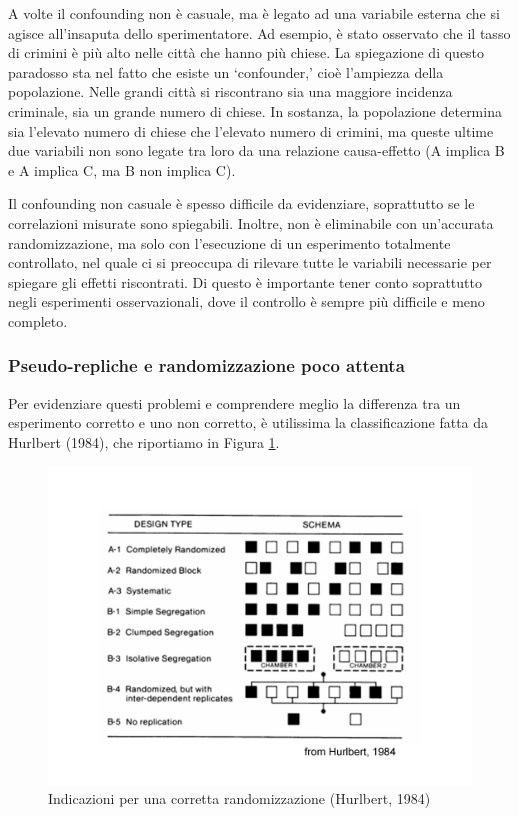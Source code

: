 \documentclass[a4paper,12pt,oneside]{book}
\begin{document}
A volte il confounding non è casuale, ma è legato ad una variabile esterna che si agisce all'insaputa dello sperimentatore. Ad esempio, è stato osservato che il tasso di crimini è più alto nelle città che hanno più chiese. La spiegazione di questo paradosso sta nel fatto che esiste un `confounder,' cioè l'ampiezza della popolazione. Nelle grandi città si riscontrano sia una maggiore incidenza criminale, sia un grande numero di chiese. In sostanza, la popolazione determina sia l'elevato numero di chiese che l'elevato numero di crimini, ma queste ultime due variabili non sono legate tra loro da una relazione causa-effetto (A implica B e A implica C, ma B non implica C).

Il confounding non casuale è spesso difficile da evidenziare, soprattutto se le correlazioni misurate sono spiegabili. Inoltre, non è eliminabile con un'accurata randomizzazione, ma solo con l'esecuzione di un esperimento totalmente controllato, nel quale ci si preoccupa di rilevare tutte le variabili necessarie per spiegare gli effetti riscontrati. Di questo è importante tener conto soprattutto negli esperimenti osservazionali, dove il controllo è sempre più difficile e meno completo.

\hypertarget{pseudo-repliche-e-randomizzazione-poco-attenta}{%
\subsubsection{Pseudo-repliche e randomizzazione poco attenta}\label{pseudo-repliche-e-randomizzazione-poco-attenta}}

Per evidenziare questi problemi e comprendere meglio la differenza tra un esperimento corretto e uno non corretto, è utilissima la classificazione fatta da Hurlbert (1984), che riportiamo in Figura \ref{fig:figName23}.

\begin{figure}

{\centering \includegraphics[width=0.9\linewidth]{_images/Randomisation} 

}

\caption{Indicazioni per una corretta randomizzazione (Hurlbert, 1984)}\label{fig:figName23}
\end{figure}
\end{document}
